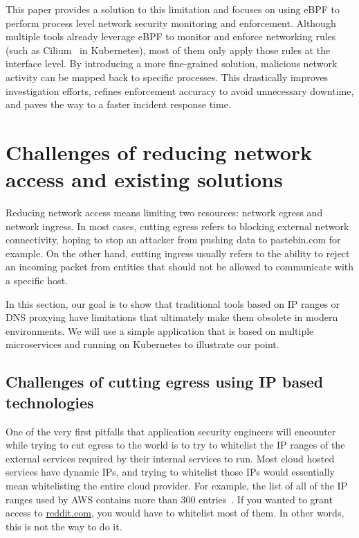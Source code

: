 This paper provides a solution to this limitation and focuses on using eBPF to perform process level network security monitoring and enforcement. Although multiple tools already leverage eBPF to monitor and enforce networking rules (such as Cilium~\cite{ProcessLevelNetworkSecurityMonitoring:Cilium} in Kubernetes), most of them only apply those rules at the interface level. By introducing a more fine-grained solution, malicious network activity can be mapped back to specific processes. This drastically improves investigation efforts, refines enforcement accuracy to avoid unnecessary downtime, and paves the way to a faster incident response time.

\section{Challenges of reducing network access and existing solutions}

Reducing network access means limiting two resources: network egress and network ingress. In most cases, cutting egress refers to blocking external network connectivity, hoping to stop an attacker from pushing data to pastebin.com for example. On the other hand, cutting ingress usually refers to the ability to reject an incoming packet from entities that should not be allowed to communicate with a specific host.

In this section, our goal is to show that traditional tools based on IP ranges or DNS proxying have limitations that ultimately make them obsolete in modern environments. We will use a simple application that is based on multiple microservices and running on Kubernetes to illustrate our point.

\subsection{Challenges of cutting egress using IP based technologies}

One of the very first pitfalls that application security engineers will encounter while trying to cut egress to the world is to try to whitelist the IP ranges of the external services required by their internal services to run. Most cloud hosted services have dynamic IPs, and trying to whitelist those IPs would essentially mean whitelisting the entire cloud provider. For example, the list of all of the IP ranges used by AWS contains more than 300 entries~\cite{ProcessLevelNetworkSecurityMonitoring:AWS}. If you wanted to grant access to \url{reddit.com}, you would have to whitelist most of them. In other words, this is not the way to do it.

